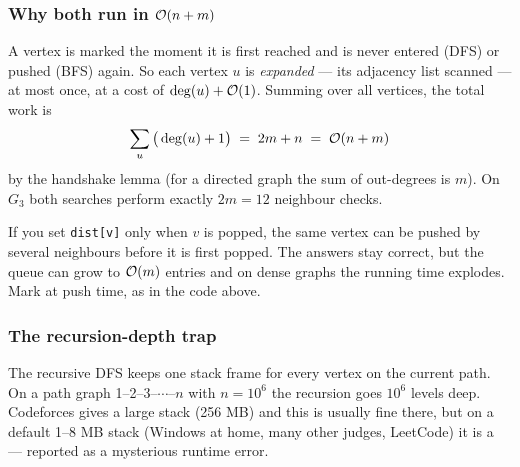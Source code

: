 \subsubsection*{Why both run in $\mathcal{O}(n+m)$}

\begin{invariantbox}
A vertex is marked the moment it is first reached and is never entered (DFS) or pushed (BFS) again. So each vertex $u$ is \emph{expanded} --- its adjacency list scanned --- at most once, at a cost of $\deg(u)+\mathcal{O}(1)$. Summing over all vertices, the total work is
\[
    \sum_{u}\big(\deg(u)+1\big) \;=\; 2m + n \;=\; \mathcal{O}(n+m)
\]
by the handshake lemma (for a directed graph the sum of out-degrees is $m$). On $G_3$ both searches perform exactly $2m=12$ neighbour checks.
\end{invariantbox}

\begin{warningbox}
If you set \texttt{dist[v]} only when $v$ is popped, the same vertex can be pushed by several neighbours before it is first popped. The answers stay correct, but the queue can grow to $\mathcal{O}(m)$ entries and on dense graphs the running time explodes. Mark at push time, as in the code above.
\end{warningbox}

\subsubsection*{The recursion-depth trap}

The recursive DFS keeps one stack frame for every vertex on the current path. On a path graph 1--2--3--$\cdots$--$n$ with $n=10^6$ the recursion goes $10^6$ levels deep. Codeforces gives a large stack (256 MB) and this is usually fine there, but on a default 1--8 MB stack (Windows at home, many other judges, LeetCode) it is a \stackoverflow{} --- reported as a mysterious runtime error.

